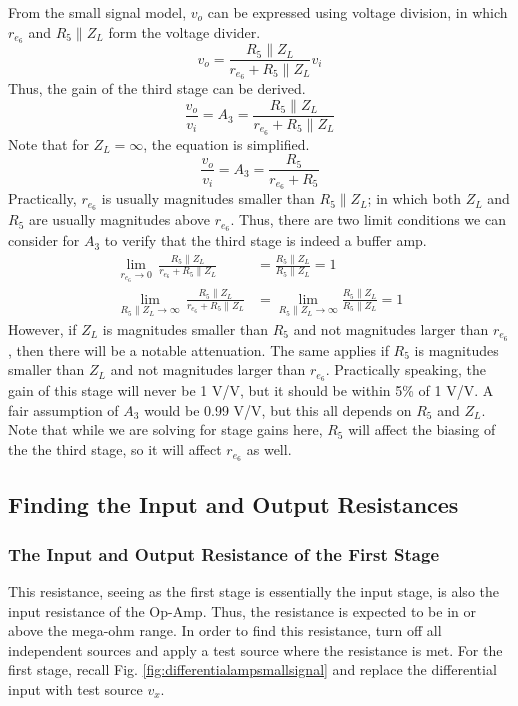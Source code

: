 \documentclass[lettersize,journal]{IEEEtran}
\begin{document}
From the small signal model, $v_o$ can be expressed using voltage division, 
in which $r_{e_6}$ and $R_5 \parallel Z_L$ form the voltage divider.
\begin{equation}
\label{eq:analysis3_1}
v_o = \frac{R_5 \parallel Z_L}{r_{e_6} + R_5 \parallel Z_L} v_i 
\end{equation}
Thus, the gain of the third stage can be derived.
\begin{equation}
\label{gainA3}
\frac{v_o}{v_i} = A_3 = \frac{R_5 \parallel Z_L}{r_{e_6} + R_5 \parallel Z_L}
\end{equation}
Note that for $Z_L = \infty$, the equation is simplified.
\begin{equation}
\label{gainA3_ZLinfty}
\frac{v_o}{v_i} = A_3 = \frac{R_5}{r_{e_6} + R_5}
\end{equation}
Practically, $r_{e_6}$ is usually magnitudes smaller than $R_5 \parallel Z_L$;
in which both $Z_L$ and $R_5$ are usually magnitudes above $r_{e_6}$. Thus, 
there are two limit conditions we can consider for $A_3$ to verify that the 
third stage is indeed a buffer amp. 
\begin{align}
\label{limits1}
\lim_{r_{e_6} \rightarrow 0} \,\frac{R_5 \parallel Z_L}{r_{e_6} + R_5 \parallel Z_L} &= \frac{R_5 \parallel Z_L}{R_5 \parallel Z_L} = 1 \\[1ex]
\lim_{R_5\parallel Z_L \rightarrow \infty} \,\frac{R_5 \parallel Z_L}{r_{e_6} + R_5 \parallel Z_L} &= \lim_{R_5\parallel Z_L \rightarrow \infty} \frac{R_5 \parallel Z_L}{R_5 \parallel Z_L} = 1
\end{align}
However, if $Z_L$ is magnitudes smaller than $R_5$ and not magnitudes larger than 
$r_{e_6}$, then there will be a notable attenuation. The same applies if $R_5$ is magnitudes 
smaller than $Z_L$ and not magnitudes larger than $r_{e_6}$. Practically speaking, 
the gain of this stage will never be 1 V/V, but it should be within 5\% of 1 V/V.
A fair assumption of $A_3$ would be 0.99 V/V, but this all depends on $R_5$ and $Z_L$.
Note that while we are solving for stage gains here, $R_5$ will affect the biasing of the 
the third stage, so it will affect $r_{e_6}$ as well.

\subsection{Finding the Input and Output Resistances}
\subsubsection{The Input and Output Resistance of the First Stage}
This resistance, seeing as the first stage is essentially the input stage, 
is also the input resistance of the Op-Amp. Thus, the 
resistance is expected to be in or above the mega-ohm range. In order to find this 
resistance, turn off all independent sources and apply a test source where the 
resistance is met. For the first stage, recall Fig. \ref{fig:differentialampsmallsignal}
and replace the differential input with test source $v_x$.
\end{document}
